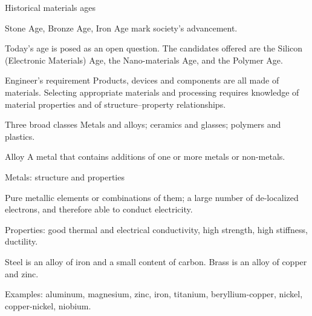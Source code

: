 \documentclass[11pt]{article}
\begin{document}
\begin{keydef}{Historical materials ages}
\begin{points}
\item Stone Age, Bronze Age, Iron Age mark society's advancement.
\item Today's age is posed as an open question. The candidates offered are the
Silicon (Electronic Materials) Age, the Nano-materials Age, and the Polymer Age.
\end{points}
\end{keydef}

\begin{keydef}{Engineer's requirement}
Products, devices and components are all made of materials. Selecting
appropriate materials and processing requires knowledge of material properties
and of structure--property relationships. 
\end{keydef}


\begin{keydef}{Three broad classes}
Metals and alloys; ceramics and glasses; polymers and plastics. 
\end{keydef}


\begin{keydef}{Alloy}
A metal that contains additions of one or more metals or non-metals.
\end{keydef}

\begin{keydef}{Metals: structure and properties}
\begin{points}
\item Pure metallic elements or combinations of them; a large number of
de-localized electrons, and therefore able to conduct electricity. 
\item Properties: good thermal and electrical conductivity, high strength, high
stiffness, ductility. 
\item Steel is an alloy of iron and a small content of carbon. Brass is an alloy
of copper and zinc. 
\item Examples: aluminum, magnesium, zinc, iron, titanium, beryllium-copper,
nickel, copper-nickel, niobium. 
\end{points}
\end{keydef}

\end{document}
